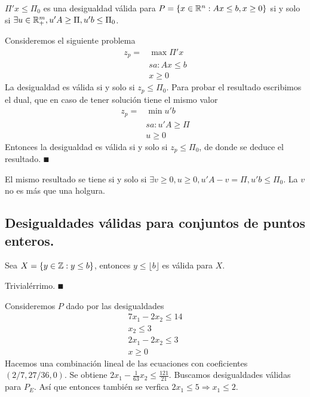 \documentclass[MIOP.tex]{subfiles}
\begin{document}
\begin{prop}
$\Pi'x\leq\Pi_0$ es una desigualdad válida para $P=\{x\in\mathbb{R}^n:Ax\leq b,x\geq 0\}$ si y solo si $\exists u\in\mathbb{R}^m_+,u'A\geq\Pi,u'b\leq\Pi_0$.
\end{prop}
\begin{dem}
Consideremos el siguiente problema
\begin{align*}
z_p=& \max \Pi'x\\
   &sa: Ax\leq b\\
   &x\geq 0
\end{align*}
La desigualdad es válida si y solo si $z_p\leq\Pi_0$. Para probar el resultado escribimos el dual, que en caso de tener solución tiene el mismo valor
\begin{align*}
z_p=& \min u'b\\
   &sa: u'A\geq \Pi\\
   &u\geq 0
\end{align*}
Entonces la desigualdad es válida si y solo si $z_p\leq\Pi_0$, de donde se deduce el resultado. 
$\QED$
\end{dem}
\begin{coro}
El mismo resultado se tiene si y solo si $\exists v\geq 0, u\geq 0, u'A-v= \Pi, u'b\leq\Pi_0$. La $v$ no es más que una holgura.
\end{coro}

\subsection{Desigualdades válidas para conjuntos de puntos enteros.}
\begin{prop}
Sea $X=\{y\in\mathbb{Z}:y\leq b\}$, entonces $y\leq\lfloor b\rfloor$ es válida para $X$.
\end{prop}
\begin{dem}
Trivialérrimo. $\QED$
\end{dem}
\begin{ej}
Consideremos $P$ dado por las desigualdades
\begin{align*}
7x_1-2x_2\leq 14\\
x_2\leq 3\\
2x_1-2x_2\leq 3\\
x\geq 0
\end{align*}
Hacemos una combinación lineal de las ecuaciones con coeficientes $(2/7,27/36, 0)$. Se obtiene $2x_1-\frac{1}{63}x_2\leq\frac{121}{21}$. Buscamos desigualdades válidas para $P_E$. Así que entonces también se verfica $2x_1\leq 5\Rightarrow x_1\leq 2$.
\end{ej}
\end{document}
